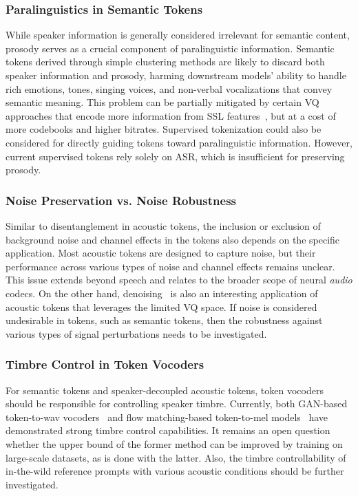 \subsubsection{Paralinguistics in Semantic Tokens}
While speaker information is generally considered irrelevant for semantic content, prosody serves as a crucial component of paralinguistic information.
Semantic tokens derived through simple clustering methods are likely to discard both speaker information and prosody, harming downstream models' ability to handle rich emotions, tones, singing voices, and non-verbal vocalizations that convey semantic meaning.
This problem can be partially mitigated by certain VQ approaches that encode more information from SSL features~\cite{huang2023repcodec,shi24h_interspeech,mousavi2024should}, but at a cost of more codebooks and higher bitrates.
Supervised tokenization could also be considered for directly guiding tokens toward paralinguistic information. 
However, current supervised tokens rely solely on ASR, which is insufficient for preserving prosody.

\vspace{0.05in}
\subsubsection{Noise Preservation vs. Noise Robustness}
Similar to disentanglement in acoustic tokens, the inclusion or exclusion of background noise and channel effects in the tokens also depends on the specific application.
Most acoustic tokens are designed to capture noise, but their performance across various types of noise and channel effects remains unclear.
This issue extends beyond speech and relates to the broader scope of neural \textit{audio} codecs.
On the other hand, denoising~\cite{zeghidour2021soundstream} is also an interesting application of acoustic tokens that leverages the limited VQ space.
If noise is considered undesirable in tokens, such as semantic tokens, then the robustness against various types of signal perturbations needs to be investigated.

\vspace{0.05in}
\subsubsection{Timbre Control in Token Vocoders}
For semantic tokens and speaker-decoupled acoustic tokens, token vocoders should be responsible for controlling speaker timbre.
Currently, both GAN-based token-to-wav vocoders~\cite{guo2024vec2wav} and flow matching-based token-to-mel models~\cite{du2024cosyvoice} have demonstrated strong timbre control capabilities. 
It remains an open question whether the upper bound of the former method can be improved by training on large-scale datasets, as is done with the latter.
Also, the timbre controllability of in-the-wild reference prompts with various acoustic conditions should be further investigated.

